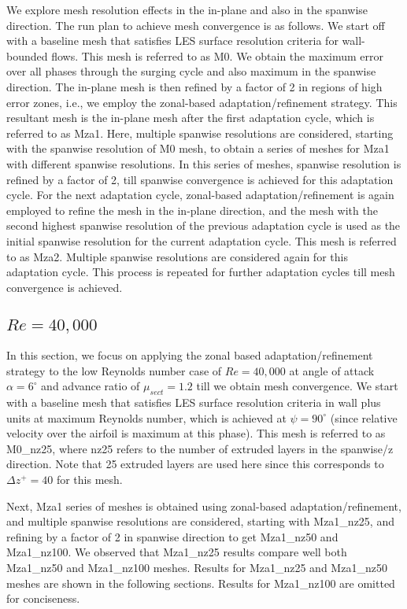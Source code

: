 We explore mesh resolution effects in the in-plane and also in the spanwise direction. 
The run plan to achieve mesh convergence is as follows. 
We start off with a baseline mesh that satisfies LES surface resolution criteria for wall-bounded flows. This mesh is referred to as M0.
We obtain the maximum error over all phases through the surging cycle and also maximum in the spanwise direction.
The in-plane mesh is then refined by a factor of 2 in regions of high error zones, i.e., we employ the zonal-based adaptation/refinement strategy.
This resultant mesh is the in-plane mesh after the first adaptation cycle, which is referred to as Mza1.
Here, multiple spanwise resolutions are considered, starting with the spanwise resolution of M0 mesh, to obtain a series of meshes for Mza1 with different spanwise resolutions.
In this series of meshes, spanwise resolution is refined by a factor of 2, till spanwise convergence is achieved for this adaptation cycle. 
For the next adaptation cycle, zonal-based adaptation/refinement is again employed to refine the mesh in the in-plane direction, and the mesh with the second highest spanwise resolution of the previous adaptation cycle is used as the initial spanwise resolution for the current adaptation cycle. 
This mesh is referred to as Mza2.
Multiple spanwise resolutions are considered again for this adaptation cycle.
This process is repeated for further adaptation cycles till mesh convergence is achieved.

\subsection{ $Re=40,000$}


In this section, we focus on applying the zonal based adaptation/refinement strategy to the low Reynolds number case of $Re=40,000$ at angle of attack $\alpha=6^\circ$ and advance ratio of $\mu_{sect}=1.2$ till we obtain mesh convergence.
We start with a baseline mesh that satisfies LES surface resolution criteria in wall plus units at maximum Reynolds number, which is achieved at $\psi=90^\circ$ (since relative velocity over the airfoil is maximum at this phase). 
This mesh is referred to as M0\_nz25, where nz25 refers to the number of extruded layers in the spanwise/z direction. Note that 25 extruded layers are used here since this corresponds to $\Delta z^+ = 40$ for this mesh.

Next, Mza1 series of meshes is obtained using zonal-based adaptation/refinement, and multiple spanwise resolutions are considered, starting with Mza1\_nz25, and refining by a factor of 2 in spanwise direction to get Mza1\_nz50 and Mza1\_nz100.
We observed that Mza1\_nz25 results compare well both Mza1\_nz50 and Mza1\_nz100 meshes.
Results for Mza1\_nz25 and Mza1\_nz50 meshes are shown in the following sections.
Results for Mza1\_nz100 are omitted for conciseness.

